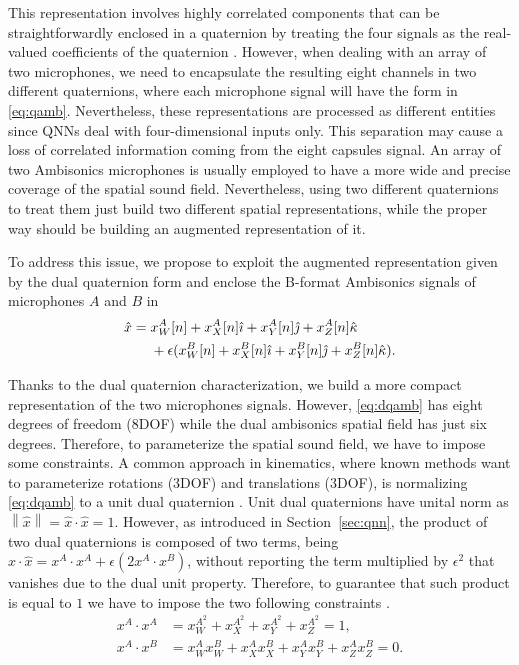 \documentclass[3p, preprint, twocolumn]{elsarticle}
\begin{document}
This representation involves highly correlated components that can be straightforwardly enclosed in a quaternion by treating the four signals as the real-valued coefficients of the quaternion \cite{ComminielloICASSP2019b, QSSL}. However, when dealing with an array of two microphones, we need to encapsulate the resulting eight channels in two different quaternions, where each microphone signal will have the form in \eqref{eq:qamb}. Nevertheless, these representations are processed as different entities since QNNs deal with four-dimensional inputs only. This separation may cause a loss of correlated information coming from the eight capsules signal. An array of two Ambisonics microphones is usually employed to have a more wide and precise coverage of the spatial sound field. Nevertheless, using two different quaternions to treat them just build two different spatial representations, while the proper way should be building an augmented representation of it.

To address this issue, we propose to exploit the augmented representation given by the dual quaternion form and enclose the B-format Ambisonics signals of microphones $A$ and $B$ in
\begin{equation}
\label{eq:dqamb}
\begin{split}
    \hat{x} = \; &x_{W}^{A}[n] + x_{X}^{A}[n] {\hat{\imath}} + x_{Y}^{A}[n] {\hat{\jmath}} + x_{Z}^{A}[n] {\hat{\kappa}} \\
    &+ \epsilon (x_{W}^{B}[n] + x_{X}^{B}[n] {\hat{\imath}} + x_{Y}^{B}[n] {\hat{\jmath}} + x_{Z}^{B}[n] {\hat{\kappa}}).
\end{split}
\end{equation}

Thanks to the dual quaternion characterization, we build a more compact representation of the two microphones signals. However, \eqref{eq:dqamb} has eight degrees of freedom (8DOF) while the dual ambisonics spatial field has just six degrees. Therefore, to parameterize the spatial sound field, we have to impose some constraints. A common approach in kinematics, where known methods want to parameterize rotations (3DOF) and translations (3DOF), is normalizing \eqref{eq:dqamb} to a unit dual quaternion \cite{TsiotrasDualQuat2020, Schwung2021RigidBody, Poppelbaum2021DQRigid, Samanc2021TheNS}. Unit dual quaternions have unital norm as $\left\|\hat{x}\right\| = \hat{x} \cdot \hat{x} =1$. However, as introduced in Section~\ref{sec:qnn}, the product of two dual quaternions is composed of two terms, being $\hat{x} \cdot \hat{x} = x^A \cdot x^A + \epsilon(2 x^A \cdot x^B)$, without reporting the term multiplied by $\epsilon^2$ that vanishes due to the dual unit property. Therefore, to guarantee that such product is equal to $1$ we have to impose the two following constraints \cite{CaoDual2021, Valverde2018DynamicMA}.
\begin{align}
\label{eq:1const}
    x^A \cdot x^A &= x_{W}^{A^{2}} + x_{X}^{A^{2}} + x_{Y}^{A^{2}} + x_{Z}^{A^{2}} = 1, \\
    x^A \cdot x^B &= x_{W}^{A}x_{W}^{B} + x_{X}^{A}x_{X}^{B} + x_{Y}^{A}x_{Y}^{B} + x_{Z}^{A}x_{Z}^{B} = 0.
\end{align}
\end{document}
